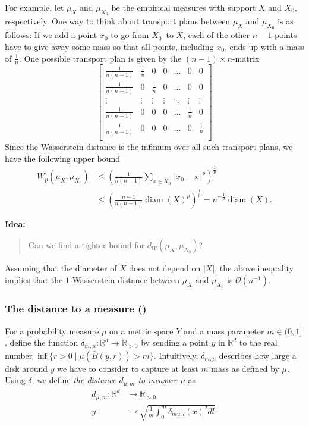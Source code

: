 \documentclass[10pt,a4paper]{article}
\theoremstyle{definition}
\newcommand{\R}{\mathbb{R}}
\newenvironment{idea}{%
	\begin{tcolorbox}[colback=green, breakable, sharp corners]
		\textbf{Idea: }
		\medskip
		\begin{quote}
			\centering
}{\end{quote}\medskip\end{tcolorbox}}
\begin{document}
For example, let $\mu_X$ and $\mu_{X_0}$ be the empirical measures with support $X$ and $X_0$, respectively. One way to think about transport plans between $\mu_X$ and $\mu_{X_0}$ is as follows: If we add a point $x_0$ to go from $X_0$ to $X$, each of the other $n-1$ points have to give away some mass so that all points, including $x_0$, ends up with a mass of $\frac{1}{n}$. One possible transport plan is given by the $(n-1)\times n$-matrix
$$
	\begin{bmatrix} 
	\frac{1}{n(n-1)} & \frac{1}{n} & 0 & 0 & \dots  & 0 & 0\\
	\frac{1}{n(n-1)} & 0 & \frac{1}{n} & 0 & \dots  & 0 & 0\\
	\vdots & \vdots & \vdots & \vdots & \ddots & \vdots & \vdots \\
	\frac{1}{n(n-1)} & 0 & 0 & 0 & \hdots & \frac{1}{n}  & 0 \\
	\frac{1}{n(n-1)} & 0 & 0 & 0 & \hdots & 0 & \frac{1}{n}  \\
	\end{bmatrix}
$$
Since the Wasserstein distance is the infimum over all such transport plans, we have the following upper bound
\begin{align*}
W_p(\mu_X, \mu_{X_0})&\leq \left(\frac{1}{n(n-1)}\sum_{x\in X_0}\Vert x_0-x\Vert^p\right)^{\frac{1}{p}} \\&\leq\left(\frac{n-1}{n(n-1)}\operatorname{diam}(X)^p\right)^{\frac{1}{p}} = n^{-\frac{1}{p}} \operatorname{diam}(X).
\end{align*}

\begin{idea}
	Can we find a tighter bound for $d_W(\mu_X, \mu_{X_0})$?
\end{idea}

Assuming that the diameter of $X$ does not depend on $|X|$, the above inequality implies that the $1$-Wasserstein distance between $\mu_X$ and $\mu_{X_0}$ is $\mathcal{O}(n^{-1})$.

\subsubsection{The distance to a measure (\autocite{Buchet2013})}
For a probability measure $\mu$ on a metric space $Y$ and a mass parameter $m\in(0,1]$, define the function $\delta_{m,\mu}\colon\R^d\to\R_{>0}$ by sending a point $y$ in $\R^d$ to the real number $\inf\{r>0\mid\mu(\bar{B}(y,r))>m\}$. Intuitively, $\delta_{m,\mu}$ describes how large a disk around $y$ we have to consider to capture at least $m$ mass as defined by $\mu$. Using $\delta$, we define \textit{the distance $d_{\mu,m}$ to measure $\mu$} as
\begin{align*}
	d_{\mu,m}\colon\R^d&\to\R_{>0}\\
	y&\mapsto\sqrt{\frac{1}{m}\int_0^m\delta_{mu,l}(x)^2dl}.
\end{align*}
\end{document}
